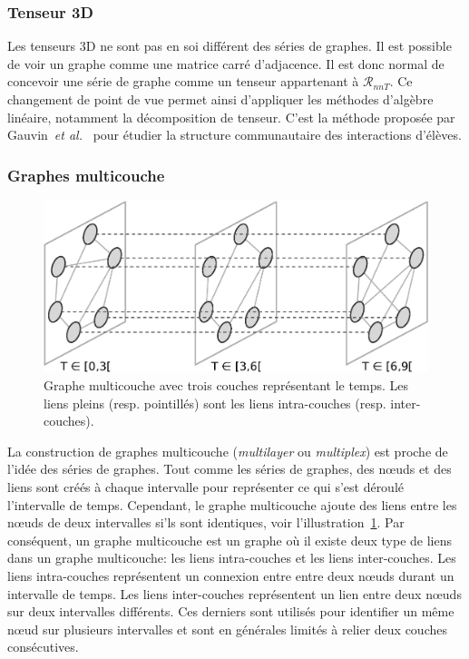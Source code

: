 \subsubsection{Tenseur 3D}
Les tenseurs 3D ne sont pas en soi différent des séries de graphes.
Il est possible de voir un graphe comme une matrice carré d'adjacence.
Il est donc normal de concevoir une série de graphe comme un tenseur appartenant à $\mathcal{R}_{nnT}$.
Ce changement de point de vue permet ainsi d'appliquer les méthodes d'algèbre linéaire, notamment la décomposition de tenseur.
C'est la méthode proposée par Gauvin~\emph{et al.}~\cite{Gauvin2014} pour étudier la structure communautaire des interactions d'élèves.



\subsubsection{Graphes multicouche}
\begin{figure}[h]
\centering
\includegraphics[width=0.7\linewidth]{img/Intro/multiplex.eps}
\caption{Graphe multicouche avec trois couches représentant le temps.
Les liens pleins (resp. pointillés) sont les liens intra-couches (resp. inter-couches).}
\label{fig:exemple_multiplex}
\end{figure}
La construction de graphes multicouche (\emph{multilayer} ou \emph{multiplex}) est proche de l'idée des séries de graphes.
Tout comme les séries de graphes, des n\oe uds et des liens sont créés à chaque intervalle pour représenter ce qui s'est déroulé l'intervalle de temps.
Cependant, le graphe multicouche ajoute des liens entre les n\oe uds de deux intervalles si'ls sont identiques, voir l'illustration~\ref{fig:exemple_multiplex}.
Par conséquent, un graphe multicouche est un graphe où il existe deux type de liens dans un graphe multicouche: les liens intra-couches et les liens inter-couches.
Les liens intra-couches représentent un connexion entre entre deux n\oe uds durant un intervalle de temps.
Les liens inter-couches représentent un lien entre deux n\oe uds sur deux intervalles différents.
Ces derniers sont utilisés pour identifier un même n\oe ud sur plusieurs intervalles et sont en générales limités à relier deux couches consécutives.

